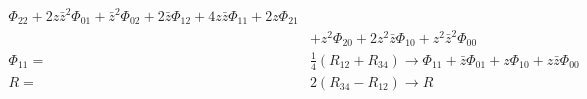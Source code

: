 \begin{align*}
    \Phi_{22} + 2z\bar{z}^2\Phi_{01}  + \bar{z}^2 \Phi_{02}
    + 2\bar{z} \Phi_{12} + 4z\bar{z} \Phi_{11} + 2z \Phi_{21} \\
    &+ z^2 \Phi_{20} + 2z^2\bar{z} \Phi_{10}  + z^2\bar{z}^2 \Phi_{00}   \\
    \Phi_{11}=& \frac{1}{4} (R_{12} + R_{34})  \to %
    \Phi_{11} + \bar{z} \Phi_{01} +z \Phi_{10} +z\bar{z} \Phi_{00}  \\
    R= & 2(R_{34}-R_{12})\to R
\end{align*}


